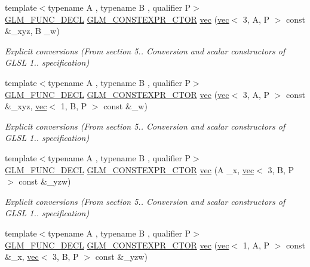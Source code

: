 \begin{DoxyCompactItemize}
{\footnotesize template$<$typename A , typename B , qualifier P$>$ }\\\hyperlink{setup_8hpp_ab2d052de21a70539923e9bcbf6e83a51}{G\+L\+M\+\_\+\+F\+U\+N\+C\+\_\+\+D\+E\+CL} \hyperlink{setup_8hpp_ad34178a09666081abdb573c14d1f4a5a}{G\+L\+M\+\_\+\+C\+O\+N\+S\+T\+E\+X\+P\+R\+\_\+\+C\+T\+OR} \hyperlink{structglm_1_1vec_3_014_00_01_t_00_01_q_01_4_af4d56895a23186981b30f2ef72a780c9}{vec} (\hyperlink{structglm_1_1vec}{vec}$<$ 3, A, P $>$ const \&\+\_\+xyz, B \+\_\+w)
\begin{DoxyCompactList}\small\item\em Explicit conversions (From section 5.. Conversion and scalar constructors of G\+L\+SL 1.. specification) \end{DoxyCompactList}\item 
{\footnotesize template$<$typename A , typename B , qualifier P$>$ }\\\hyperlink{setup_8hpp_ab2d052de21a70539923e9bcbf6e83a51}{G\+L\+M\+\_\+\+F\+U\+N\+C\+\_\+\+D\+E\+CL} \hyperlink{setup_8hpp_ad34178a09666081abdb573c14d1f4a5a}{G\+L\+M\+\_\+\+C\+O\+N\+S\+T\+E\+X\+P\+R\+\_\+\+C\+T\+OR} \hyperlink{structglm_1_1vec_3_014_00_01_t_00_01_q_01_4_a978b89aabfd77a4d64bbd7d347e98ffe}{vec} (\hyperlink{structglm_1_1vec}{vec}$<$ 3, A, P $>$ const \&\+\_\+xyz, \hyperlink{structglm_1_1vec}{vec}$<$ 1, B, P $>$ const \&\+\_\+w)
\begin{DoxyCompactList}\small\item\em Explicit conversions (From section 5.. Conversion and scalar constructors of G\+L\+SL 1.. specification) \end{DoxyCompactList}\item 
{\footnotesize template$<$typename A , typename B , qualifier P$>$ }\\\hyperlink{setup_8hpp_ab2d052de21a70539923e9bcbf6e83a51}{G\+L\+M\+\_\+\+F\+U\+N\+C\+\_\+\+D\+E\+CL} \hyperlink{setup_8hpp_ad34178a09666081abdb573c14d1f4a5a}{G\+L\+M\+\_\+\+C\+O\+N\+S\+T\+E\+X\+P\+R\+\_\+\+C\+T\+OR} \hyperlink{structglm_1_1vec_3_014_00_01_t_00_01_q_01_4_a91225fa0646f68aae775792183d3e0df}{vec} (A \+\_\+x, \hyperlink{structglm_1_1vec}{vec}$<$ 3, B, P $>$ const \&\+\_\+yzw)
\begin{DoxyCompactList}\small\item\em Explicit conversions (From section 5.. Conversion and scalar constructors of G\+L\+SL 1.. specification) \end{DoxyCompactList}\item 
{\footnotesize template$<$typename A , typename B , qualifier P$>$ }\\\hyperlink{setup_8hpp_ab2d052de21a70539923e9bcbf6e83a51}{G\+L\+M\+\_\+\+F\+U\+N\+C\+\_\+\+D\+E\+CL} \hyperlink{setup_8hpp_ad34178a09666081abdb573c14d1f4a5a}{G\+L\+M\+\_\+\+C\+O\+N\+S\+T\+E\+X\+P\+R\+\_\+\+C\+T\+OR} \hyperlink{structglm_1_1vec_3_014_00_01_t_00_01_q_01_4_a307578dc6d0a7ff71643918d29ddcaa8}{vec} (\hyperlink{structglm_1_1vec}{vec}$<$ 1, A, P $>$ const \&\+\_\+x, \hyperlink{structglm_1_1vec}{vec}$<$ 3, B, P $>$ const \&\+\_\+yzw)

\end{DoxyCompactItemize}
